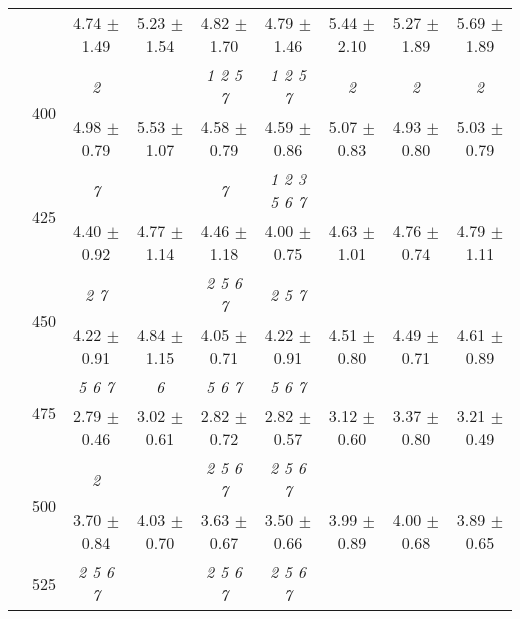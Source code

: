 \begin{table}[h]
{\begin{tabular}{
        ccccccccc}
 & & \cellcolor[HTML]{EFEFEF} 4.74 $\pm$ 1.49& \cellcolor[HTML]{EFEFEF} 5.23 $\pm$ 1.54& \cellcolor[HTML]{EFEFEF} 4.82 $\pm$ 1.70& \cellcolor[HTML]{EFEFEF} 4.79 $\pm$ 1.46& \cellcolor[HTML]{EFEFEF} 5.44 $\pm$ 2.10& \cellcolor[HTML]{EFEFEF} 5.27 $\pm$ 1.89& \cellcolor[HTML]{EFEFEF} 5.69 $\pm$ 1.89 \\ 
 & \multirow{2}{*}{400}& \textit{ 2 }& & \textit{ 1 2 5 7 }& \textit{ 1 2 5 7 }& \textit{ 2 }& \textit{ 2 }& \textit{ 2 } \\ 
 & & 4.98 $\pm$ 0.79& 5.53 $\pm$ 1.07& 4.58 $\pm$ 0.79& 4.59 $\pm$ 0.86& 5.07 $\pm$ 0.83& 4.93 $\pm$ 0.80& 5.03 $\pm$ 0.79 \\ 
 & \multirow{2}{*}{425}& \cellcolor[HTML]{EFEFEF} \textit{ 7 }& \cellcolor[HTML]{EFEFEF} & \cellcolor[HTML]{EFEFEF} \textit{ 7 }& \cellcolor[HTML]{EFEFEF} \textit{ 1 2 3 5 6 7 }& \cellcolor[HTML]{EFEFEF} & \cellcolor[HTML]{EFEFEF} & \cellcolor[HTML]{EFEFEF}  \\ 
 & & \cellcolor[HTML]{EFEFEF} 4.40 $\pm$ 0.92& \cellcolor[HTML]{EFEFEF} 4.77 $\pm$ 1.14& \cellcolor[HTML]{EFEFEF} 4.46 $\pm$ 1.18& \cellcolor[HTML]{EFEFEF} 4.00 $\pm$ 0.75& \cellcolor[HTML]{EFEFEF} 4.63 $\pm$ 1.01& \cellcolor[HTML]{EFEFEF} 4.76 $\pm$ 0.74& \cellcolor[HTML]{EFEFEF} 4.79 $\pm$ 1.11 \\ 
 & \multirow{2}{*}{450}& \textit{ 2 7 }& & \textit{ 2 5 6 7 }& \textit{ 2 5 7 }& & &  \\ 
 & & 4.22 $\pm$ 0.91& 4.84 $\pm$ 1.15& 4.05 $\pm$ 0.71& 4.22 $\pm$ 0.91& 4.51 $\pm$ 0.80& 4.49 $\pm$ 0.71& 4.61 $\pm$ 0.89 \\ 
 & \multirow{2}{*}{475}& \cellcolor[HTML]{EFEFEF} \textit{ 5 6 7 }& \cellcolor[HTML]{EFEFEF} \textit{ 6 }& \cellcolor[HTML]{EFEFEF} \textit{ 5 6 7 }& \cellcolor[HTML]{EFEFEF} \textit{ 5 6 7 }& \cellcolor[HTML]{EFEFEF} & \cellcolor[HTML]{EFEFEF} & \cellcolor[HTML]{EFEFEF}  \\ 
 & & \cellcolor[HTML]{EFEFEF} 2.79 $\pm$ 0.46& \cellcolor[HTML]{EFEFEF} 3.02 $\pm$ 0.61& \cellcolor[HTML]{EFEFEF} 2.82 $\pm$ 0.72& \cellcolor[HTML]{EFEFEF} 2.82 $\pm$ 0.57& \cellcolor[HTML]{EFEFEF} 3.12 $\pm$ 0.60& \cellcolor[HTML]{EFEFEF} 3.37 $\pm$ 0.80& \cellcolor[HTML]{EFEFEF} 3.21 $\pm$ 0.49 \\ 
 & \multirow{2}{*}{500}& \textit{ 2 }& & \textit{ 2 5 6 7 }& \textit{ 2 5 6 7 }& & &  \\ 
 & & 3.70 $\pm$ 0.84& 4.03 $\pm$ 0.70& 3.63 $\pm$ 0.67& 3.50 $\pm$ 0.66& 3.99 $\pm$ 0.89& 4.00 $\pm$ 0.68& 3.89 $\pm$ 0.65 \\ 
 & \multirow{2}{*}{525}& \cellcolor[HTML]{EFEFEF} \textit{ 2 5 6 7 }& \cellcolor[HTML]{EFEFEF} & \cellcolor[HTML]{EFEFEF} \textit{ 2 5 6 7 }& \cellcolor[HTML]{EFEFEF} \textit{ 2 5 6 7 }& \cellcolor[HTML]{EFEFEF} & \cellcolor[HTML]{EFEFEF} & \cellcolor[HTML]{EFEFEF}  \\ 

\end{tabular}}
\end{table}
